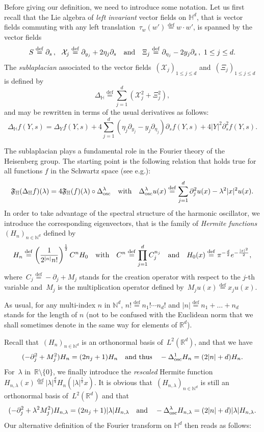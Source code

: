 \documentclass[11pt]{article}
\theoremstyle{definition}
\numberwithin{equation}{section}
\numberwithin{figure}{section}
\numberwithin{table}{section}
\newcommand{\lam}{\lambda}
\newcommand{\D}{\Delta}
\newcommand*\cX{\mathcal{X}}
\newcommand*\fF{\mathfrak{F}}
\newcommand*\N{\mathbb{N}}
\newcommand*\R{\mathbb{R}}
\newcommand*\bbH{\mathbb{H}}
\newcommand{\andf}{\quad\hbox{and}\quad}
\newcommand{\with}{\quad\hbox{with}\quad}
\newcommand\suite[3]{(#1_{#2})_{#2\in {#3}}}
\newcommand*\eqdefa{\overset{\mathrm{def}}{=}}
\newcommand*{\osc}{\mathrm{osc}}
\begin{document}
Before giving our definition, we need to introduce some notation. Let us first recall that the Lie algebra of \emph{left invariant} vector fields on $\bbH^d$, that is vector fields commuting with any left translation~$\tau_w(w') \eqdefa w\cdot w'$, is spanned by the vector fields
\begin{equation}\label{defleft}
S\eqdefa\partial_s\,,\ \ \cX_j\eqdefa\partial_{y_j} +2\eta_j\partial_s\andf \Xi_j\eqdefa \partial_{\eta_j} -2y_j\partial_s\,,\ 1\leq j\leq d.
\end{equation}
The \emph{sublaplacian} associated to the vector fields~$(\cX_j)_{1\leq j\leq d}$ and~$(\Xi_j)_{1\leq j\leq d}$ is defined by
\begin{equation}\label{defLaplace}
\D_{\bbH} \eqdefa \sum_{j=1} ^d (\cX_j^2+\Xi_j^2),
\end{equation}
and may be rewritten in terms of the usual derivatives as follows:
\[
\D_\bbH f(Y,s) = \D_{Y} f (Y,s) + 4\sum_{j=1} ^d (\eta_j \partial_{y_j} -y_j\partial_{\eta_j}) \partial_s f(Y,s) +4|Y|^2\partial_s^2 f(Y,s).
\]

The sublaplacian plays a fundamental role in the Fourier theory of the Heisenberg group. The starting point is the following relation that holds true for all functions $f$ in the Schwartz space (see e.g.\cite{huet, O}):
\begin{equation}\label{FourierEtLaplace}
\fF_{\bbH}(\D_\bbH f) (\lam) = 4\fF_{\bbH}(f)(\lam) \circ \D_{\osc} ^\lam \with \D_{\osc}^\lam u (x) \eqdefa\sum_{j=1}^d \partial_j^2 u(x) - \lam^2|x|^2 u(x).
\end{equation}
In order to take advantage of the spectral structure of the harmonic oscillator, we introduce the corresponding eigenvectors, that is the family of \emph{Hermite functions}~$(H_n)_{n\in\N^d}$ defined by
\[
H_n \eqdefa \left(\frac 1 {2^{|n|} n!}\right) ^{\frac 12}C^n H_0 \with C^n \eqdefa \prod_{j=1}^d C_j^{n_j}
\andf H_0(x)\eqdefa \pi^{-\frac d 2} e^{-\frac {|x|^2} 2},
\]
where~$C_j\eqdefa -\partial_j +M_j$ stands for the creation operator with respect to the $j$-th variable and~$M_j$ is the multiplication operator defined by~$M_ju(x)\eqdefa x_ju(x)$.

As usual, for any multi-index $n$ in $\N^d$, $n!\eqdefa n_1!\dotsm n_d!$ and $|n|\eqdefa n_1+\dots+n_d$ stands for the length of $n$ (not to be confused with the Euclidean norm that we shall sometimes denote in the same way for elements of $\R^d$).

Recall that~$ \suite H n {\N^d}$ is an orthonormal basis of~$L^2(\R^d)$, and that we have
\[
(-\partial_j^2+M_j^2) H_n =(2n_j+1) H_n \quad\hbox{and thus}\quad -\D_{\osc}^1 H_n = (2|n|+d) H_n.
\]
For~$\lam$ in~$\R\setminus\{0\}$, we finally introduce the \emph{rescaled} Hermite function~$H_{n,\lam} (x)\eqdefa |\lam|^{\frac d 4} H_n(|\lam|^{\frac 12} x)$. It is obvious that~$(H_{n,\lam})_{n\in \N^d}$ is still an orthonormal basis of~$L^2(\R^d)$ and that
\begin{equation}\label{relationsHHermiteD}
(-\partial_j^2+\lam^2M_j^2) H_{n,\lam} =(2n_j+1)|\lam| H_{n,\lam} \andf -\D_{\osc}^\lam H_{n,\lam} = (2|n|+d)|\lam| H_{n,\lam}.
\end{equation}
Our alternative definition of the Fourier transform on $\bbH^d$ then reads as follows:
\end{document}
